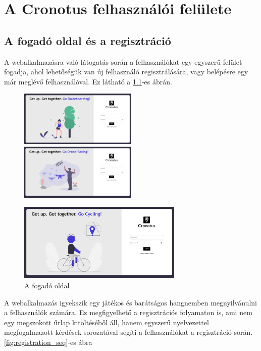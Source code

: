 \onehalfspacing
\chapter{A Cronotus felhasználói felülete}

\section{A fogadó oldal és a regisztráció}

A webalkalmazásra való látogatás során a felhasználókat egy egyszerű felület fogadja, ahol lehetőségük van új felhasználó regisztrálására,
vagy belépésre egy már meglévő felhasználóval. Ez látható a \ref{fig:landing_page}-es ábrán.

\begin{figure}[h]
	\includegraphics[width=0.5\textwidth]{images/login_page.png}
	\includegraphics[width=0.5\textwidth]{images/login_2.png}
	\begin{center}
		\includegraphics[width=0.7\textwidth]{images/login_3.png}
	\end{center}
	\caption{A fogadó oldal}
	\label{fig:landing_page}
\end{figure}

\newpage


A webalkalmazás igyekszik egy játékos és barátságos hangnemben megnyilvánulni a felhasználók számára. Ez megfigyelhető a regisztrációs folyamaton
is, ami nem egy megszokott űrlap kitöltéséből áll, hanem egyszerű nyelvezettel megfogalmazott kérdések sorozatával segíti a felhasználókat
a regisztráció során. \ref{fig:registration_seq}-es ábra

